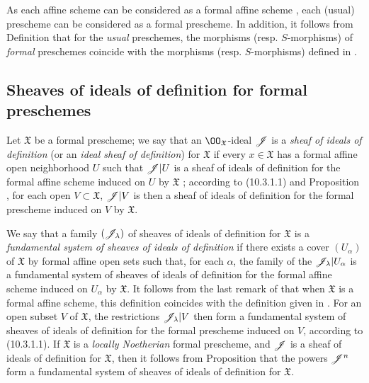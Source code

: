 \begin{env}[10.4.8]
\label{1.10.4.8}
As each affine scheme can be considered as a formal affine scheme , each (usual) prescheme can be considered as a formal prescheme.
In addition, it follows from Definition  that for the \emph{usual} preschemes, the morphisms (resp. $S$-morphisms) of \emph{formal} preschemes coincide with the morphisms (resp. $S$-morphisms) defined in .
\end{env}

\subsection{Sheaves of ideals of definition for formal preschemes}
\label{subsection:1.10.5}

\begin{env}[10.5.1]
\label{1.10.5.1}
Let $\mathfrak{X}$ be a formal prescheme; we say that an $\OO_\mathfrak{X}$-ideal $\mathscr{J}$ is a \emph{sheaf of ideals of definition} (or an \emph{ideal sheaf of definition}) for $\mathfrak{X}$ if every $x\in\mathfrak{X}$ has a formal affine open neighborhood $U$ such that $\mathscr{J}|U$ is a sheaf of ideals of definition for the formal affine scheme induced on $U$ by $\mathfrak{X}$ ; according to (10.3.1.1) and Proposition , for each open $V\subset\mathfrak{X}$, $\mathscr{J}|V$ is then a sheaf of ideals of definition for the formal prescheme induced on $V$ by $\mathfrak{X}$.

We say that a family $(\mathscr{J}_\lambda)$ of sheaves of ideals of definition for $\mathfrak{X}$ is a \emph{fundamental system}
\emph{of sheaves of ideals of definition} if there exists a cover $(U_\alpha)$ of $\mathfrak{X}$ by formal affine open sets such that, for each $\alpha$, the family of the $\mathscr{J}_\lambda|U_\alpha$ is a fundamental system of sheaves of ideals of definition  for the formal affine scheme induced on $U_\alpha$ by $\mathfrak{X}$.
It follows from the last remark of  that when $\mathfrak{X}$ is a formal affine scheme, this definition coincides with the definition given in .
For an open subset $V$ of $\mathfrak{X}$, the restrictions $\mathscr{J}_\lambda|V$ then form a fundamental system of sheaves of ideals of definition for the formal prescheme induced on $V$, according to (10.3.1.1).
If $\mathfrak{X}$ is a \emph{locally Noetherian} formal prescheme, and $\mathscr{J}$ is a sheaf of ideals of definition for $\mathfrak{X}$, then it follows from Proposition  that the powers $\mathscr{J}^n$ form a fundamental system of sheaves of ideals of definition for $\mathfrak{X}$.
\end{env}

